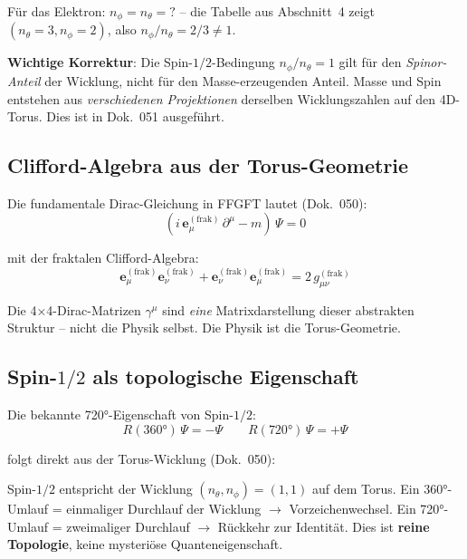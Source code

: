 Für das Elektron: $n_\phi = n_\theta = ?$ -- die Tabelle aus
Abschnitt~4 zeigt $(n_\theta = 3, n_\phi = 2)$, also
$n_\phi/n_\theta = 2/3 \neq 1$.

\textbf{Wichtige Korrektur}: Die Spin-$1/2$-Bedingung
$n_\phi/n_\theta = 1$ gilt für den \emph{Spinor-Anteil} der Wicklung,
nicht für den Masse-erzeugenden Anteil. Masse und Spin entstehen aus
\emph{verschiedenen Projektionen} derselben Wicklungszahlen auf den
4D-Torus. Dies ist in Dok.~051 ausgeführt.

\subsection{Clifford-Algebra aus der Torus-Geometrie}

Die fundamentale Dirac-Gleichung in FFGFT lautet (Dok.~050):
\begin{equation}
    (i\,\mathbf{e}_\mu^{(\mathrm{frak})}\,\partial^\mu - m)\,\Psi = 0
\end{equation}

mit der fraktalen Clifford-Algebra:
\begin{equation}
    \mathbf{e}_\mu^{(\mathrm{frak})} \mathbf{e}_\nu^{(\mathrm{frak})}
    + \mathbf{e}_\nu^{(\mathrm{frak})} \mathbf{e}_\mu^{(\mathrm{frak})}
    = 2\,g_{\mu\nu}^{(\mathrm{frak})}
\end{equation}

Die 4×4-Dirac-Matrizen $\gamma^\mu$ sind \emph{eine} Matrixdarstellung
dieser abstrakten Struktur -- nicht die Physik selbst. Die Physik
ist die Torus-Geometrie.

\subsection{Spin-$1/2$ als topologische Eigenschaft}

Die bekannte 720°-Eigenschaft von Spin-$1/2$:
\begin{equation}
    R(360°)\,\Psi = -\Psi \qquad R(720°)\,\Psi = +\Psi
\end{equation}

folgt direkt aus der Torus-Wicklung (Dok.~050):

\begin{keybox}
Spin-$1/2$ entspricht der Wicklung $(n_\theta, n_\phi) = (1,1)$ auf
dem Torus. Ein 360°-Umlauf = einmaliger Durchlauf der Wicklung $\to$
Vorzeichenwechsel. Ein 720°-Umlauf = zweimaliger Durchlauf $\to$
Rückkehr zur Identität. Dies ist \textbf{reine Topologie}, keine
mysteriöse Quanteneigenschaft.
\end{keybox}

